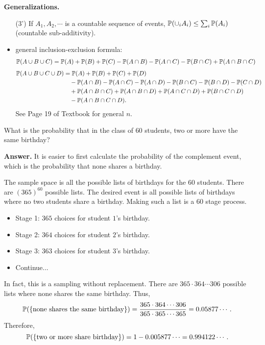   \textbf{Generalizations.}
  \begin{itemize}
  \item [(3')] If $A_1,A_2,\cdots$ is a countable sequence of events,
    $\mathbb{P}(\cup_i A_i) \le \sum_i \mathbb{P}(A_i)$ (countable sub-additivity).
  \item general inclusion-exclusion formula:
    \begin{align*}
      \mathbb{P}(A\cup B\cup C)
      & = \mathbb{P}(A) + \mathbb{P}(B) + \mathbb{P}(C) - \mathbb{P}(A\cap B) - \mathbb{P}(A\cap C) -\mathbb{P}(B\cap C) + \mathbb{P}(A\cap B\cap C)
    \end{align*}
    \begin{align*}
      \mathbb{P}(A\cup B\cup C\cup D)
      & = \mathbb{P}(A) + \mathbb{P}(B) + \mathbb{P}(C) + \mathbb{P}(D)\\
      & \quad - \mathbb{P}(A\cap B) - \mathbb{P}(A\cap C) - \mathbb{P}(A\cap D) - \mathbb{P}(B\cap C) -\mathbb{P}(B\cap D) - \mathbb{P}(C\cap D)\\
      & \quad + \mathbb{P}(A\cap B\cap C) + \mathbb{P}(A\cap B\cap D) + \mathbb{P}(A\cap C\cap D) + \mathbb{P}(B\cap C\cap D)\\
      & \quad - \mathbb{P}(A\cap B\cap C\cap D).
    \end{align*}
    See Page 19 of Textbook for general $n$.
  \end{itemize}
  \begin{example}
    What is the probability that in the class of $60$ students, two or more have
    the same birthday?
  \end{example}
  \textbf{Answer.} It is easier to first calculate the probability of the
  complement event, which is the probability that none shares a birthday.

  The sample space is all the possible lists of birthdays for the $60$ students.
  There are $(365)^{60}$ possible lists. The desired event is all possible lists
  of birthdays where no two students share a birthday. Making such a list is a
  $60$ stage process.
  \begin{itemize}
  \item Stage 1: $365$ choices for student $1$'s birthday.
  \item Stage 2: $364$ choices for student $2$'s birthday.
  \item Stage 3: $363$ choices for student $3$'s birthday.
  \item Continue...
  \end{itemize}
  In fact, this is a sampling without replacement. There are $365\cdot 364\cdots
  306$ possible lists where none shares the same birthday. Thus,
  \[
    \mathbb{P}(\{\text{none shares the same birthday}\}) = \frac{365\cdot 364\cdots
      306}{365\cdot 365\cdots 365} = 0.05877\cdots.
  \]
  Therefore,
  \[
    \mathbb{P}(\{\text{two or more share birthday}\}) = 1- 0.005877\cdots = 0.994122\cdots.
  \]





